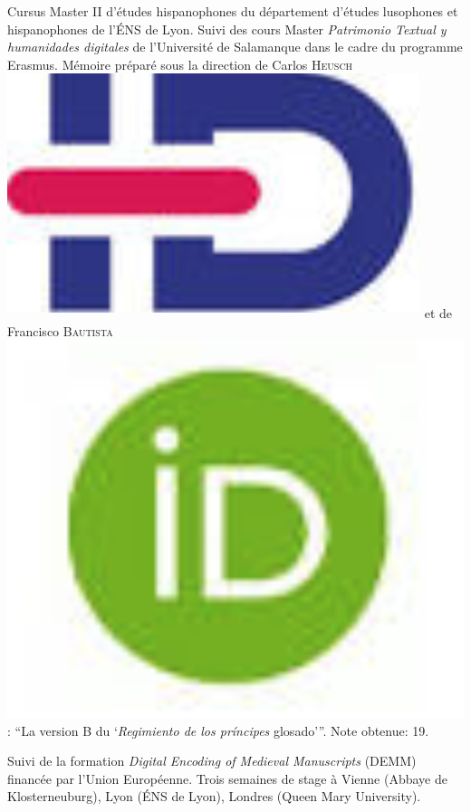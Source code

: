 \begin{rubric}{Cursus}
                                \entry*[2015-2016]
                             Master II d'études hispanophones du département d'études lusophones
                        et hispanophones de l'ÉNS de Lyon. Suivi des cours Master \textit{Patrimonio
                        Textual y humanidades digitales} de l’Université de Salamanque dans
                        le cadre du programme Erasmus. Mémoire préparé sous la direction de Carlos \textsc{Heusch}\href{https://www.idref.fr/055838413}{\textsuperscript{\includegraphics[scale=0.025]{img/idref.png}}} et de Francisco \textsc{Bautista}\href{https://orcid.org/0000-0002-2676-0388}{\includegraphics[scale=0.025]{img/orcid.png}}: \enquote{La
                        version B du \enquote{\textit{Regimiento de los príncipes}
                        glosado}}. Note obtenue: 19. 
                    
                                \entry*
                            Suivi de la formation \textit{Digital Encoding of Medieval
                        Manuscripts} (DEMM) financée par l’Union Européenne. Trois semaines de
                        stage à Vienne (Abbaye de Klosterneuburg), Lyon (ÉNS de Lyon), Londres
                        (Queen Mary University). 
                    

\end{rubric}
